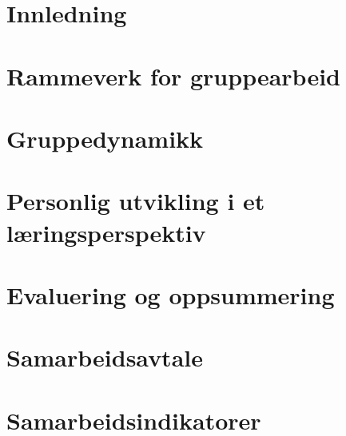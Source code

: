 \documentclass[11pt,norsk,a4paper]{report}
\begin{document}


\newpage

\tableofcontents
\listoftables
\listoffigures
\newpage

\chapter{Innledning}


\chapter{Rammeverk for gruppearbeid}


\chapter{Gruppedynamikk}


\chapter{Personlig utvikling i et læringsperspektiv}


\chapter{Evaluering og oppsummering}


\newpage
\appendix
{}
\chapter{Samarbeidsavtale}

\chapter{Samarbeidsindikatorer}





\end{document}
